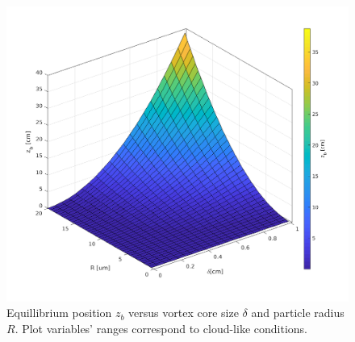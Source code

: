 \documentclass[../main.tex]{subfiles}
\begin{document}
\begin{figure}
\centering
\noindent \includegraphics[width=30pc]{gfx/z_b_vs_delta_R.png}
\caption{Equillibrium position $z_b$ versus vortex core size $\delta$ and particle radius $R$. Plot variables' ranges correspond to cloud-like conditions.}
\label{fig:ch3_0}
\end{figure}
\end{document}
